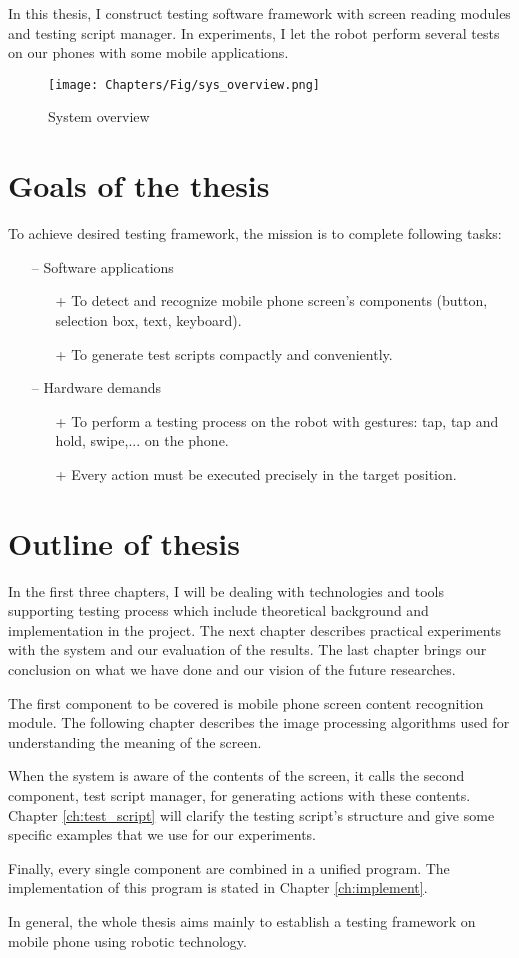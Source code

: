 In this thesis, I construct testing software framework with screen reading modules and testing script manager. In experiments, I let the robot perform several tests on our phones with some mobile applications.

	\begin{figure}
		\centering
		\texttt{[image: Chapters/Fig/sys\_overview.png]}
		\caption{System overview}
		\label{fig:sys_overview}
	\end{figure}

\section{Goals of the thesis}
To achieve desired testing framework, the mission is to complete following tasks:
	\begin{itemize}
		\item[--] Software applications
        	\begin{itemize}
				\item[+] To detect and recognize mobile phone screen's components (button, selection box, text, keyboard).
				\item[+] To generate test scripts compactly and conveniently.
			\end{itemize}
		\item[--] Hardware demands
        	\begin{itemize}
				\item[+] To perform a testing process on the robot with gestures: tap, tap and hold, swipe,... on the phone.
				\item[+] Every action must be executed precisely in the target position.
			\end{itemize}
	\end{itemize}

\section{Outline of thesis}
In the first three chapters, I will be dealing with technologies and tools supporting testing process which include theoretical background and implementation in the project. The next chapter describes practical experiments with the system and our evaluation of the results. The last chapter brings our conclusion on what we have done and our vision of the future researches.

The first component to be covered is mobile phone screen content recognition module. The following chapter describes the image processing algorithms used for understanding the meaning of the screen. 

When the system is aware of the contents of the screen, it calls the second component, test script manager, for generating actions with these contents. Chapter \ref{ch:test_script} will clarify the testing script's structure and give some specific examples that we use for our experiments.

Finally, every single component are combined in a unified program. The implementation of this program is stated in Chapter \ref{ch:implement}.

In general, the whole thesis aims mainly to establish a testing framework on mobile phone using robotic technology. \nocite{radim_thesis}
